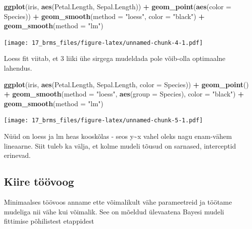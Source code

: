 \documentclass[]{book}
\newenvironment{Shaded}{\begin{snugshade}}{\end{snugshade}}
\newcommand{\KeywordTok}[1]{\textcolor[rgb]{0.13,0.29,0.53}{\textbf{#1}}}
\newcommand{\DataTypeTok}[1]{\textcolor[rgb]{0.13,0.29,0.53}{#1}}
\newcommand{\StringTok}[1]{\textcolor[rgb]{0.31,0.60,0.02}{#1}}
\newcommand{\OperatorTok}[1]{\textcolor[rgb]{0.81,0.36,0.00}{\textbf{#1}}}
\newcommand{\NormalTok}[1]{#1}
\begin{document}
\begin{Shaded}
\begin{Highlighting}[]
\KeywordTok{ggplot}\NormalTok{(iris, }\KeywordTok{aes}\NormalTok{(Petal.Length, Sepal.Length)) }\OperatorTok{+}\StringTok{ }
\StringTok{  }\KeywordTok{geom_point}\NormalTok{(}\KeywordTok{aes}\NormalTok{(}\DataTypeTok{color =}\NormalTok{ Species)) }\OperatorTok{+}
\StringTok{  }\KeywordTok{geom_smooth}\NormalTok{(}\DataTypeTok{method =} \StringTok{"loess"}\NormalTok{, }\DataTypeTok{color =} \StringTok{"black"}\NormalTok{) }\OperatorTok{+}
\StringTok{  }\KeywordTok{geom_smooth}\NormalTok{(}\DataTypeTok{method =} \StringTok{"lm"}\NormalTok{)}
\end{Highlighting}
\end{Shaded}

\texttt{[image: 17\_brms\_files/figure-latex/unnamed-chunk-4-1.pdf]}

Loess fit viitab, et 3 liiki ühe sirgega mudeldada pole võib-olla
optimaalne lahendus.

\begin{Shaded}
\begin{Highlighting}[]
\KeywordTok{ggplot}\NormalTok{(iris, }\KeywordTok{aes}\NormalTok{(Petal.Length, Sepal.Length, }\DataTypeTok{color =}\NormalTok{ Species)) }\OperatorTok{+}\StringTok{ }
\StringTok{  }\KeywordTok{geom_point}\NormalTok{() }\OperatorTok{+}
\StringTok{  }\KeywordTok{geom_smooth}\NormalTok{(}\DataTypeTok{method =} \StringTok{"loess"}\NormalTok{, }\KeywordTok{aes}\NormalTok{(}\DataTypeTok{group =}\NormalTok{ Species), }\DataTypeTok{color =} \StringTok{"black"}\NormalTok{) }\OperatorTok{+}
\StringTok{  }\KeywordTok{geom_smooth}\NormalTok{(}\DataTypeTok{method =} \StringTok{"lm"}\NormalTok{)}
\end{Highlighting}
\end{Shaded}

\texttt{[image: 17\_brms\_files/figure-latex/unnamed-chunk-5-1.pdf]}

Nüüd on loess ja lm heas kooskõlas - seos y\textasciitilde{}x vahel
oleks nagu enam-vähem lineaarne. Siit tuleb ka välja, et kolme mudeli
tõusud on sarnased, interceptid erinevad.

\subsection{Kiire töövoog}\label{kiire-toovoog}

Minimaalses töövoos anname ette võimalikult vähe parameetreid ja töötame
mudeliga nii vähe kui võimalik. See on mõeldud ülevaatena Bayesi mudeli
fittimise põhilistest etappidest
\end{document}
